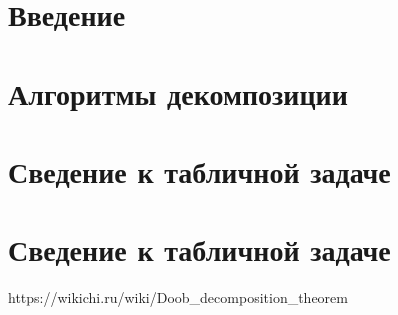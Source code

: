 \documentclass[a4paper,12pt]{book}
\begin{document}
	\newpage
	\tableofcontents
	
	\newpage
	\chapter{Введение}
	
	
	
	\newpage
	\chapter{Алгоритмы декомпозиции}
	
	

	\newpage
	\chapter{Сведение к табличной задаче}
	

	\newpage
	\chapter{Сведение к табличной задаче}
	

\begin{thebibliography}{1}
	https://wikichi.ru/wiki/Doob\_decomposition\_theorem
\end{thebibliography}


	
\end{document}
